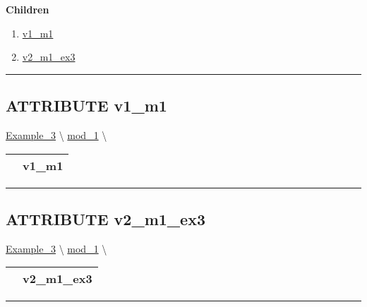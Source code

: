 \par


\textbf{Children}
\begin{enumerate}
\item \hyperlink{ecldoc:intest.example_3.mod_1.v1_m1}{v1\_m1}
\item \hyperlink{ecldoc:intest.example_3.mod_1.v2_m1_ex3}{v2\_m1\_ex3}
\end{enumerate}

\rule{\linewidth}{0.5pt}

\subsection*{\textsf{\colorbox{headtoc}{\color{white} ATTRIBUTE}
v1\_m1}}

\hypertarget{ecldoc:intest.example_3.mod_1.v1_m1}{}
\hspace{0pt} \hyperlink{ecldoc:intest.Example_3}{Example_3} \textbackslash 
\hspace{0pt} \hyperlink{ecldoc:intest.Example_3.mod_1}{mod_1} \textbackslash 

{\renewcommand{\arraystretch}{1.5}
\begin{tabularx}{\textwidth}{|>{\raggedright\arraybackslash}l|X|}
\hline
\hspace{0pt}\mytexttt{\color{red} } & \textbf{v1\_m1} \\
\hline
\end{tabularx}
}

\par


\rule{\linewidth}{0.5pt}
\subsection*{\textsf{\colorbox{headtoc}{\color{white} ATTRIBUTE}
v2\_m1\_ex3}}

\hypertarget{ecldoc:intest.example_3.mod_1.v2_m1_ex3}{}
\hspace{0pt} \hyperlink{ecldoc:intest.Example_3}{Example_3} \textbackslash 
\hspace{0pt} \hyperlink{ecldoc:intest.Example_3.mod_1}{mod_1} \textbackslash 

{\renewcommand{\arraystretch}{1.5}
\begin{tabularx}{\textwidth}{|>{\raggedright\arraybackslash}l|X|}
\hline
\hspace{0pt}\mytexttt{\color{red} } & \textbf{v2\_m1\_ex3} \\
\hline
\end{tabularx}
}

\par


\rule{\linewidth}{0.5pt}




